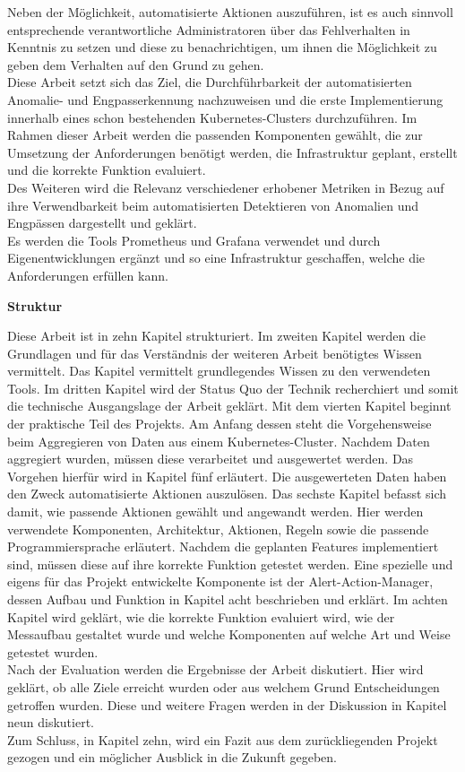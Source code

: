 \documentclass[a4paper,10pt]{scrartcl}
\begin{document}
Neben der Möglichkeit, automatisierte Aktionen auszuführen, ist es auch sinnvoll entsprechende verantwortliche Administratoren über das Fehlverhalten in Kenntnis zu setzen und diese zu benachrichtigen, um ihnen die Möglichkeit zu geben dem Verhalten auf den Grund zu gehen.\\
Diese Arbeit setzt sich das Ziel, die Durchführbarkeit der automatisierten Anomalie- und Engpasserkennung nachzuweisen und die erste Implementierung innerhalb eines schon bestehenden Kubernetes-Clusters durchzuführen. 
Im Rahmen dieser Arbeit werden die passenden Komponenten gewählt, die zur Umsetzung der Anforderungen benötigt werden, die Infrastruktur geplant, erstellt und die korrekte Funktion evaluiert.\\
Des Weiteren wird die Relevanz verschiedener erhobener Metriken in Bezug auf ihre Verwendbarkeit beim automatisierten Detektieren von Anomalien und Engpässen dargestellt und geklärt.\\
Es werden die Tools Prometheus und Grafana verwendet und durch Eigenentwicklungen ergänzt und so eine Infrastruktur geschaffen, welche die Anforderungen erfüllen kann.\\

\begin{Large}
\textbf{Struktur}\\
\end{Large}

Diese Arbeit ist in zehn Kapitel strukturiert. Im zweiten Kapitel werden die Grundlagen und für das Verständnis der weiteren Arbeit benötigtes Wissen vermittelt. Das Kapitel vermittelt grundlegendes Wissen zu den verwendeten Tools. Im dritten Kapitel wird der Status Quo der Technik recherchiert und somit die technische Ausgangslage der Arbeit geklärt. Mit dem vierten Kapitel beginnt der praktische Teil des Projekts. Am Anfang dessen steht die Vorgehensweise beim Aggregieren von Daten aus einem Kubernetes-Cluster. Nachdem Daten aggregiert wurden, müssen diese verarbeitet und ausgewertet werden. Das Vorgehen hierfür wird in Kapitel fünf erläutert. Die ausgewerteten Daten haben den Zweck automatisierte Aktionen auszulösen. Das sechste Kapitel befasst sich damit, wie passende Aktionen gewählt und angewandt werden.
Hier werden verwendete Komponenten, Architektur, Aktionen, Regeln sowie die passende Programmiersprache erläutert. Nachdem die geplanten Features implementiert sind, müssen diese auf ihre korrekte Funktion getestet werden.
Eine spezielle und eigens für das Projekt entwickelte Komponente ist der \glqq Alert-Action-Manager\grqq, dessen Aufbau und Funktion in Kapitel acht beschrieben und erklärt.
Im achten Kapitel wird geklärt, wie die korrekte Funktion evaluiert wird, wie der Messaufbau gestaltet wurde und welche Komponenten auf welche Art und Weise getestet wurden.\\
Nach der Evaluation werden die Ergebnisse der Arbeit diskutiert. Hier wird geklärt, ob alle Ziele erreicht wurden oder aus welchem Grund Entscheidungen getroffen wurden. Diese und weitere Fragen werden in der Diskussion in Kapitel neun diskutiert.\\
Zum Schluss, in Kapitel zehn, wird ein Fazit aus dem zurückliegenden Projekt gezogen und ein möglicher Ausblick in die Zukunft gegeben.
\end{document}

